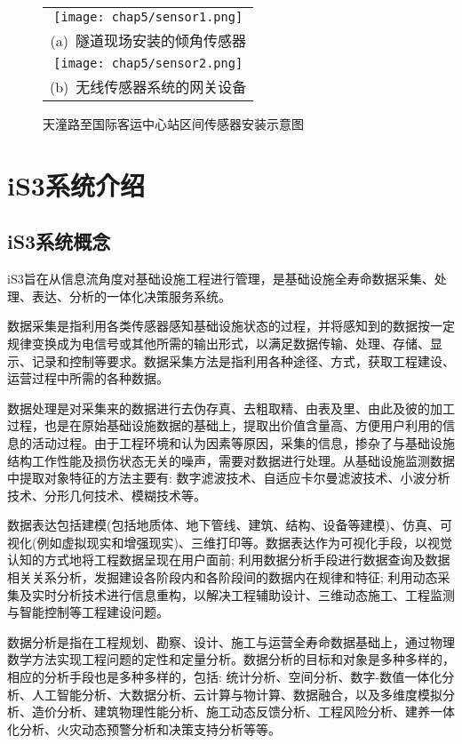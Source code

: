 \begin{figure}[htbp] 
    \centering 
    \begin{tabular}{c} 
        \texttt{[image: chap5/sensor1.png]} \\ 
        (a)~隧道现场安装的倾角传感器 \\
        \texttt{[image: chap5/sensor2.png]} \\ 
        (b)~无线传感器系统的网关设备 \\
    \end{tabular}
    \caption{天潼路至国际客运中心站区间传感器安装示意图}
    \label{fig:天潼路至国际客运中心站区间传感器安装示意图} 
\end{figure}

\section{iS3系统介绍}

\subsection{iS3系统概念}

iS3旨在从信息流角度对基础设施工程进行管理，是基础设施全寿命数据采集、处理、表达、分析的一体化决策服务系统。

数据采集是指利用各类传感器感知基础设施状态的过程，并将感知到的数据按一定规律变换成为电信号或其他所需的输出形式，以满足数据传输、处理、存储、显示、记录和控制等要求。数据采集方法是指利用各种途径、方式，获取工程建设、运营过程中所需的各种数据。

数据处理是对采集来的数据进行去伪存真、去粗取精、由表及里、由此及彼的加工过程，也是在原始基础设施数据的基础上，提取出价值含量高、方便用户利用的信息的活动过程。由于工程环境和认为因素等原因，采集的信息，掺杂了与基础设施结构工作性能及损伤状态无关的噪声，需要对数据进行处理。从基础设施监测数据中提取对象特征的方法主要有: 数字滤波技术、自适应卡尔曼滤波技术、小波分析技术、分形几何技术、模糊技术等。

数据表达包括建模(包括地质体、地下管线、建筑、结构、设备等建模)、仿真、可视化(例如虚拟现实和增强现实)、三维打印等。数据表达作为可视化手段，以视觉认知的方式地将工程数据呈现在用户面前; 利用数据分析手段进行数据查询及数据相关关系分析，发掘建设各阶段内和各阶段间的数据内在规律和特征; 利用动态采集及实时分析技术进行信息重构，以解决工程辅助设计、三维动态施工、工程监测与智能控制等工程建设问题。

数据分析是指在工程规划、勘察、设计、施工与运营全寿命数据基础上，通过物理数学方法实现工程问题的定性和定量分析。数据分析的目标和对象是多种多样的，相应的分析手段也是多种多样的，包括: 统计分析、空间分析、数字-数值一体化分析、人工智能分析、大数据分析、云计算与物计算、数据融合，以及多维度模拟分析、造价分析、建筑物理性能分析、施工动态反馈分析、工程风险分析、建养一体化分析、火灾动态预警分析和决策支持分析等等。

